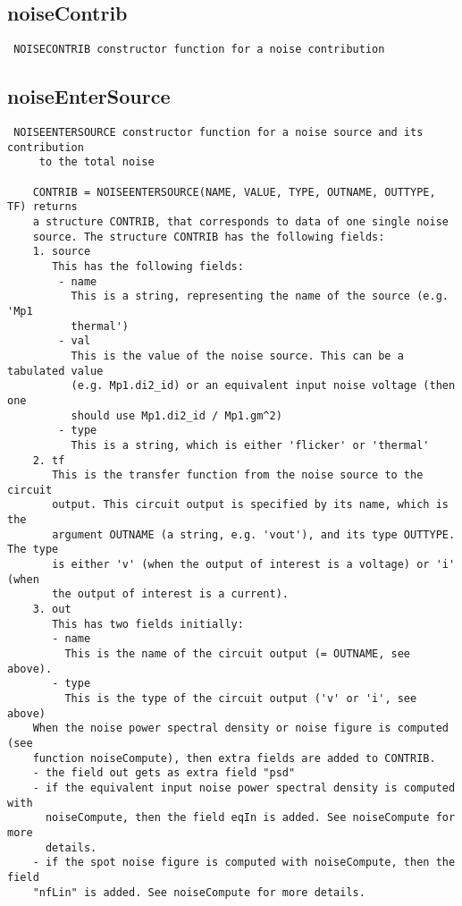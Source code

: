 \newpage
\subsection{noiseContrib}
\label{sec:noiseContrib}
\begin{verbatim}
 NOISECONTRIB constructor function for a noise contribution

\end{verbatim}

\newpage
\subsection{noiseEnterSource}
\label{sec:noiseEnterSource}
\begin{verbatim}
 NOISEENTERSOURCE constructor function for a noise source and its contribution 
     to the total noise 
 
    CONTRIB = NOISEENTERSOURCE(NAME, VALUE, TYPE, OUTNAME, OUTTYPE, TF) returns
    a structure CONTRIB, that corresponds to data of one single noise
    source. The structure CONTRIB has the following fields:
    1. source
       This has the following fields:
        - name
          This is a string, representing the name of the source (e.g. 'Mp1
          thermal')
        - val
          This is the value of the noise source. This can be a tabulated value
          (e.g. Mp1.di2_id) or an equivalent input noise voltage (then one
          should use Mp1.di2_id / Mp1.gm^2)
        - type
          This is a string, which is either 'flicker' or 'thermal'
    2. tf
       This is the transfer function from the noise source to the circuit
       output. This circuit output is specified by its name, which is the
       argument OUTNAME (a string, e.g. 'vout'), and its type OUTTYPE. The type
       is either 'v' (when the output of interest is a voltage) or 'i' (when
       the output of interest is a current).
    3. out
       This has two fields initially:
       - name
         This is the name of the circuit output (= OUTNAME, see above).
       - type
         This is the type of the circuit output ('v' or 'i', see above)
    When the noise power spectral density or noise figure is computed (see
    function noiseCompute), then extra fields are added to CONTRIB.
    - the field out gets as extra field "psd"
    - if the equivalent input noise power spectral density is computed with
      noiseCompute, then the field eqIn is added. See noiseCompute for more
      details.
    - if the spot noise figure is computed with noiseCompute, then the field
    "nfLin" is added. See noiseCompute for more details.

\end{verbatim}

